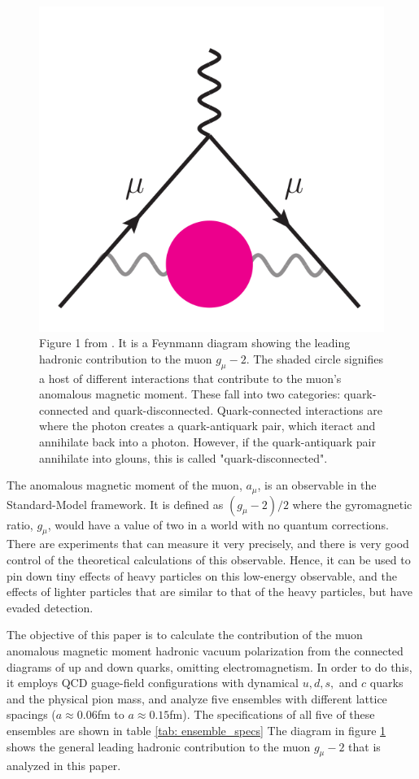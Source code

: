 \documentclass[
a4paper,
10pt,
twoside,
prd,
aps,
nofootinbib,
superscriptaddress,
floatfix,
preprintnumbers,
]{article}
\begin{document}
\begin{figure}[H]
	\centering
	\includegraphics[width=0.75\linewidth]{figures/paperFig1.png}
	\captionsetup{width=0.8\linewidth}
	\caption{%
		Figure 1 from \cite{Davies_2020}.
		It is a Feynmann diagram showing the leading hadronic contribution to the muon $g_\mu-2$.
		The shaded circle signifies a host of different interactions that contribute to the muon's anomalous magnetic moment.
		These fall into two categories: quark-connected and quark-disconnected.
		Quark-connected interactions are where the photon creates a quark-antiquark pair, which iteract and annihilate back into a photon.
		However, if the quark-antiquark pair annihilate into glouns, this is called "quark-disconnected".\cite{Davies_2020}
	}
	\label{fig: paperFig1}
\end{figure}

The anomalous magnetic moment of the muon, $a_\mu$, is an observable in the Standard-Model framework.
It is defined as $(g_\mu − 2)/2$ where the gyromagnetic ratio, $g_\mu$, would have a value of two in a world with no quantum corrections\cite{Davies_2020}.
There are experiments that can measure it very precisely, and there is very good control of the theoretical calculations of this observable\cite{Davies_2020}.
Hence, it can be used to pin down tiny effects of heavy particles on this low-energy observable, and the effects of lighter particles that are similar to that of the heavy particles, but have evaded detection.\cite{Davies_2020}

The objective of this paper is to calculate the contribution of the muon anomalous magnetic moment hadronic vacuum polarization from the connected diagrams of up and down quarks, omitting electromagnetism.
In order to do this, it employs QCD guage-field configurations with dynamical $u,d,s,$ and $c$ quarks and the physical pion mass, and analyze five ensembles with different lattice spacings ($a \approx 0.06$fm to $a \approx 0.15$fm).
The specifications of all five of these ensembles are shown in table \ref{tab: ensemble_specs}
The diagram in figure \ref{fig: paperFig1} shows the general leading hadronic contribution to the muon $g_\mu-2$ that is analyzed in this paper.
\end{document}
